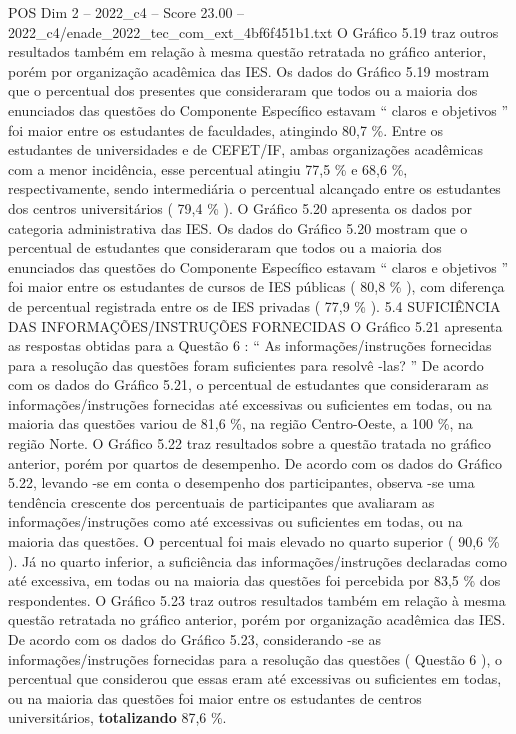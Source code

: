 \begin{textsample}{POS Dim 2 – 2022\_c4 – Score 23.00 – 2022\_c4/enade\_2022\_tec\_com\_ext\_4bf6f451b1.txt}
O Gráfico 5.19 traz outros resultados também em relação à mesma questão retratada no gráfico anterior, porém por organização acadêmica das IES.
Os dados do Gráfico 5.19 mostram que o percentual dos presentes que consideraram que todos ou a maioria dos enunciados das questões do Componente Específico estavam “ claros e objetivos ” foi maior entre os estudantes de faculdades, atingindo 80,7 \%.
Entre os estudantes de universidades e de CEFET/IF, ambas organizações acadêmicas com a menor incidência, esse percentual atingiu 77,5 \% e 68,6 \%, respectivamente, sendo intermediária o percentual alcançado entre os estudantes dos centros universitários ( 79,4 \% ).
O Gráfico 5.20 apresenta os dados por categoria administrativa das IES.
Os dados do Gráfico 5.20 mostram que o percentual de estudantes que consideraram que todos ou a maioria dos enunciados das questões do Componente Específico estavam “ claros e objetivos ” foi maior entre os estudantes de cursos de IES públicas ( 80,8 \% ), com diferença de percentual registrada entre os de IES privadas ( 77,9 \% ). 5.4 SUFICIÊNCIA DAS INFORMAÇÕES/INSTRUÇÕES FORNECIDAS O Gráfico 5.21 apresenta as respostas obtidas para a Questão 6 : “ As informações/instruções fornecidas para a resolução das questões foram suficientes para resolvê -las? ” De acordo com os dados do Gráfico 5.21, o percentual de estudantes que consideraram as informações/instruções fornecidas até excessivas ou suficientes em todas, ou na maioria das questões variou de 81,6 \%, na região Centro-Oeste, a 100 \%, na região Norte.
O Gráfico 5.22 traz resultados sobre a questão tratada no gráfico anterior, porém por quartos de desempenho.
De acordo com os dados do Gráfico 5.22, levando -se em conta o desempenho dos participantes, observa -se uma tendência crescente dos percentuais de participantes que avaliaram as informações/instruções como até excessivas ou suficientes em todas, ou na maioria das questões.
O percentual foi mais elevado no quarto superior ( 90,6 \% ).
Já no quarto inferior, a suficiência das informações/instruções declaradas como até excessiva, em todas ou na maioria das questões foi percebida por 83,5 \% dos respondentes.
O Gráfico 5.23 traz outros resultados também em relação à mesma questão retratada no gráfico anterior, porém por organização acadêmica das IES.
De acordo com os dados do Gráfico 5.23, considerando -se as informações/instruções fornecidas para a resolução das questões ( Questão 6 ), o percentual que considerou que essas eram até excessivas ou suficientes em todas, ou na maioria das questões foi maior entre os estudantes de centros universitários, \textbf{totalizando} 87,6 \%.

\end{textsample}
